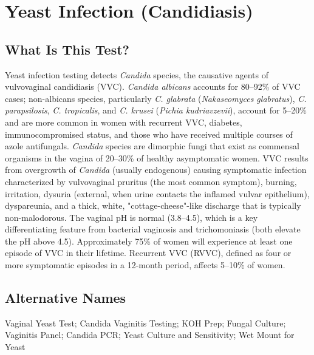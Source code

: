 \chapter{Yeast Infection (Candidiasis)}

\section*{What Is This Test?}
Yeast infection testing detects \textit{Candida} species, the causative agents of vulvovaginal candidiasis (VVC). \textit{Candida albicans} accounts for 80--92\% of VVC cases; non-albicans species, particularly \textit{C. glabrata} (\textit{Nakaseomyces glabratus}), \textit{C. parapsilosis}, \textit{C. tropicalis}, and \textit{C. krusei} (\textit{Pichia kudriavzevii}), account for 5--20\% and are more common in women with recurrent VVC, diabetes, immunocompromised status, and those who have received multiple courses of azole antifungals. \textit{Candida} species are dimorphic fungi that exist as commensal organisms in the vagina of 20--30\% of healthy asymptomatic women. VVC results from overgrowth of \textit{Candida} (usually endogenous) causing symptomatic infection characterized by vulvovaginal pruritus (the most common symptom), burning, irritation, dysuria (external, when urine contacts the inflamed vulvar epithelium), dyspareunia, and a thick, white, "cottage-cheese"-like discharge that is typically non-malodorous. The vaginal pH is normal (3.8--4.5), which is a key differentiating feature from bacterial vaginosis and trichomoniasis (both elevate the pH above 4.5). Approximately 75\% of women will experience at least one episode of VVC in their lifetime. Recurrent VVC (RVVC), defined as four or more symptomatic episodes in a 12-month period, affects 5--10\% of women.

\section*{Alternative Names}
Vaginal Yeast Test; Candida Vaginitis Testing; KOH Prep; Fungal Culture; Vaginitis Panel; Candida PCR; Yeast Culture and Sensitivity; Wet Mount for Yeast

